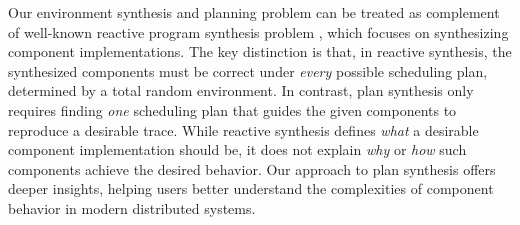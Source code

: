 
Our environment synthesis and planning problem can be treated as complement of well-known reactive program synthesis problem \cite{ReactiveSynthesis}, which focuses on synthesizing component implementations. The key distinction is that, in reactive synthesis, the synthesized components must be correct under \emph{every} possible scheduling plan, determined by a total random environment. In contrast, plan synthesis only requires finding \emph{one} scheduling plan that guides the given components to reproduce a desirable trace.
While reactive synthesis defines \emph{what} a desirable component implementation should be, it does not explain \emph{why} or \emph{how} such components achieve the desired behavior. Our approach to plan synthesis offers deeper insights, helping users better understand the complexities of component behavior in modern distributed systems.

